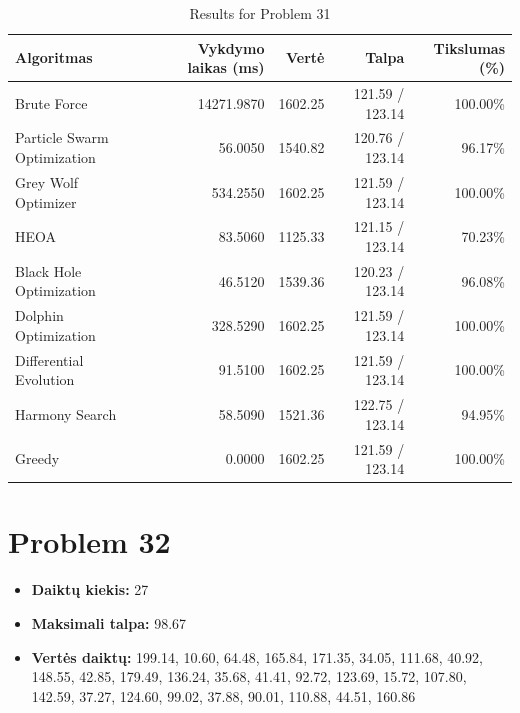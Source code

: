 \documentclass[a4paper,11pt]{article}
\begin{document}
\begin{table}[h!]
\centering
\begin{tabular}{lrrrr}
\toprule
\textbf{Algoritmas} & \textbf{Vykdymo laikas (ms)} & \textbf{Vertė} & \textbf{Talpa} & \textbf{Tikslumas (\%)} \\
\midrule
Brute Force & 14271.9870 & 1602.25 & 121.59 / 123.14 & 100.00\% \\
Particle Swarm Optimization & 56.0050 & 1540.82 & 120.76 / 123.14 & 96.17\% \\
Grey Wolf Optimizer & 534.2550 & 1602.25 & 121.59 / 123.14 & 100.00\% \\
HEOA & 83.5060 & 1125.33 & 121.15 / 123.14 & 70.23\% \\
Black Hole Optimization & 46.5120 & 1539.36 & 120.23 / 123.14 & 96.08\% \\
Dolphin Optimization & 328.5290 & 1602.25 & 121.59 / 123.14 & 100.00\% \\
Differential Evolution & 91.5100 & 1602.25 & 121.59 / 123.14 & 100.00\% \\
Harmony Search & 58.5090 & 1521.36 & 122.75 / 123.14 & 94.95\% \\
Greedy & 0.0000 & 1602.25 & 121.59 / 123.14 & 100.00\% \\
\bottomrule
\end{tabular}
\caption{Results for Problem 31}
\end{table}
\clearpage

\section*{Problem 32}
\begin{itemize}
    \item \textbf{Daiktų kiekis:} 27
    \item \textbf{Maksimali talpa:} 98.67
    \item \textbf{Vertės daiktų:} 199.14, 10.60, 64.48, 165.84, 171.35, 34.05, 111.68, 40.92, 148.55, 42.85, 179.49, 136.24, 35.68, 41.41, 92.72, 123.69, 15.72, 107.80, 142.59, 37.27, 124.60, 99.02, 37.88, 90.01, 110.88, 44.51, 160.86
\end{itemize}
\end{document}
